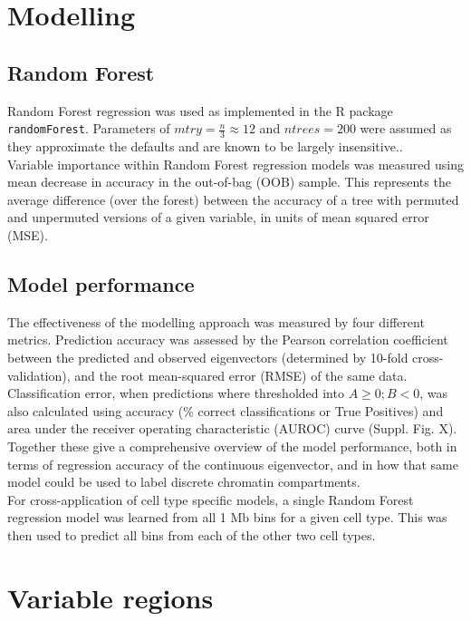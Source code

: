 \documentclass[a4paper]{report}
\begin{document}
\section{Modelling}
\subsection{Random Forest}\label{sec:rf}
Random Forest regression\cite{Breiman2001a} was used
as implemented in the R package \texttt{randomForest}.\cite{Liaw2002}
Parameters of $mtry = \frac{n}{3} \approx 12$ and $ntrees =
200$ were assumed as they approximate the defaults and are known to be
largely insensitive.\cite{Hastie2001}. \\

Variable importance within Random Forest regression models was
measured using mean decrease in accuracy in the out-of-bag (OOB) sample. This represents the average
difference (over the forest) between the accuracy of a tree with
permuted and unpermuted versions of a given variable, in units of mean
squared error (MSE).\cite{Cutler2007}

\subsection{Model performance}
The effectiveness of the modelling approach was measured by four
different metrics. Prediction accuracy was assessed by the Pearson correlation coefficient between the
predicted and observed eigenvectors (determined by 10-fold
cross-validation), and the root mean-squared error (RMSE) of the same
data. Classification error, when predictions where thresholded into
$A \geq 0; B < 0$, was also calculated using accuracy (\% correct
classifications or True Positives) and area under the receiver
operating characteristic (AUROC) curve (Suppl. Fig. X). Together these
give a comprehensive overview of the model performance, both in terms
of regression accuracy of the continuous eigenvector, and in how that
same model could be used to label discrete chromatin compartments. \\

For cross-application of cell type specific models, a single Random
Forest regression model was learned from all 1 Mb bins for a given
cell type. This was then used to predict all bins from each of the
other two cell types.

\section{Variable regions}
\end{document}
